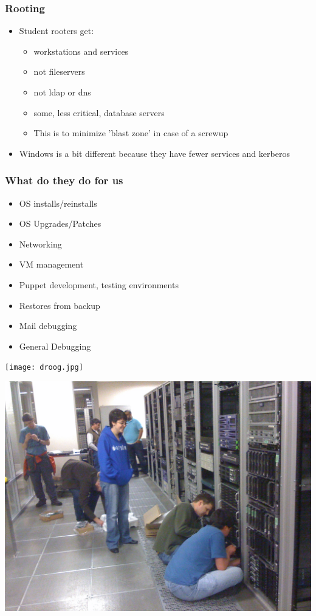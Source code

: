 \documentclass{beamer}
\begin{document}
\frame
{
    \frametitle{Rooting}
    \begin{itemize}
      \item Student rooters get:
      \begin{itemize}
        \item workstations and services 
        \item not fileservers
        \item not ldap or dns
        \item some, less critical, database servers
        \item This is to minimize 'blast zone' in case of a screwup
      \end{itemize}
      \item Windows is a bit different because they have fewer services and kerberos
    \end{itemize}
}

\frame
{
    \frametitle{What do they do for us}
    \begin{itemize}
      \item OS installs/reinstalls
      \item OS Upgrades/Patches
      \item Networking
      \item VM management
      \item Puppet development, testing environments
      \item Restores from backup
      \item Mail debugging
      \item General Debugging
    \end{itemize}
}

\frame
{
        \texttt{[image: droog.jpg]}
}

\frame
{
        \includegraphics[width=1\textwidth]{dcops.jpg}
}
\end{document}
